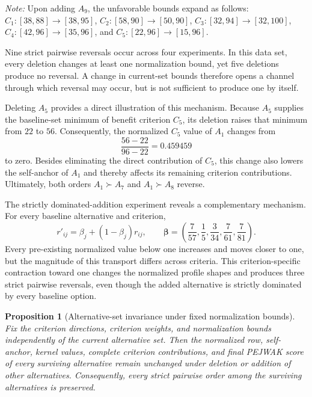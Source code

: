 \documentclass[reqno,11pt]{amsart}
\theoremstyle{definition}
\theoremstyle{plain}
\newtheorem{proposition}{Proposition}
\theoremstyle{remark}
\begin{document}
\begin{table}[htbp]
\begin{tabularx}{\textwidth}
\bottomrule
\end{tabularx}

\vspace{3pt}

\begin{minipage}{0.98\textwidth}
\footnotesize
\textit{Note:}
Upon adding $A_9$, the unfavorable bounds expand as follows:
$C_1:[38,88]\to[38,95]$,
$C_2:[58,90]\to[50,90]$,
$C_3:[32,94]\to[32,100]$,
$C_4:[42,96]\to[35,96]$, and
$C_5:[22,96]\to[15,96]$.
\end{minipage}
\end{table}

Nine strict pairwise reversals occur across four experiments. In this data set, every deletion changes at least one normalization bound, yet five deletions produce no reversal. A change in current-set bounds therefore opens a channel through which reversal may occur, but is not sufficient to produce one by itself.

Deleting $A_5$ provides a direct illustration of this mechanism. Because 
$A_5$ supplies the baseline-set minimum of benefit criterion $C_5$, its 
deletion raises that minimum from $22$ to $56$. Consequently, the normalized 
$C_5$ value of $A_1$ changes from
\[
\frac{56-22}{96-22}=0.459459
\]
to zero. Besides eliminating the direct contribution of $C_5$, this change 
also lowers the self-anchor of $A_1$ and thereby affects its remaining 
criterion contributions. Ultimately, both orders $A_1\succ A_7$ and 
$A_1\succ A_8$ reverse.

The strictly dominated-addition experiment reveals a complementary mechanism.
For every baseline alternative and criterion,
\begin{equation*}
r'_{ij}
=
\beta_j+(1-\beta_j)r_{ij},
\qquad
\boldsymbol{\beta}
=
\left(
\frac{7}{57},
\frac{1}{5},
\frac{3}{34},
\frac{7}{61},
\frac{7}{81}
\right).
\end{equation*}
Every pre-existing normalized value below one increases and moves closer to
one, but the magnitude of this transport differs across criteria. This
criterion-specific contraction toward one changes the normalized profile
shapes and produces three strict pairwise reversals, even though the added
alternative is strictly dominated by every baseline option.

\begin{proposition}[Alternative-set invariance under fixed normalization bounds]
\label{prop:fixed-reference-invariance}
Fix the criterion directions, criterion weights, and normalization bounds independently of the current alternative set. Then the normalized row, self-anchor, kernel values, complete criterion contributions, and final PEJWAK score of every surviving alternative remain unchanged under deletion or addition of other alternatives. Consequently, every strict pairwise order among the surviving alternatives is preserved.
\end{proposition}
\end{document}
